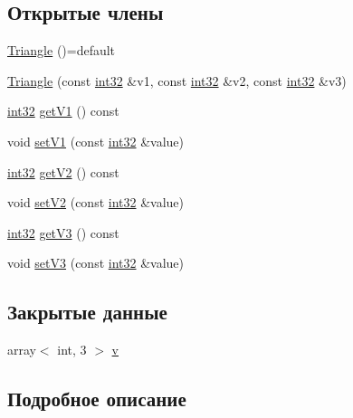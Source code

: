\subsection*{Открытые члены}
\begin{DoxyCompactItemize}
\item 
\hyperlink{class_triangle_abe6f0d035449cb80a7cc4d79baef9c3f}{Triangle} ()=default
\item 
\hyperlink{class_triangle_a287c84286a7340a754ee2df0a92af7af}{Triangle} (const \hyperlink{number_8h_a43d43196463bde49cb067f5c20ab8481}{int32} \&v1, const \hyperlink{number_8h_a43d43196463bde49cb067f5c20ab8481}{int32} \&v2, const \hyperlink{number_8h_a43d43196463bde49cb067f5c20ab8481}{int32} \&v3)
\item 
\hyperlink{number_8h_a43d43196463bde49cb067f5c20ab8481}{int32} \hyperlink{class_triangle_a0dd722e3cb9d7ea46e514f8abf76335e}{get\+V1} () const 
\item 
void \hyperlink{class_triangle_afece0efdaf53062c218d9bf70291e8ce}{set\+V1} (const \hyperlink{number_8h_a43d43196463bde49cb067f5c20ab8481}{int32} \&value)
\item 
\hyperlink{number_8h_a43d43196463bde49cb067f5c20ab8481}{int32} \hyperlink{class_triangle_a3c40179262b85e1eab30a10f9c65b898}{get\+V2} () const 
\item 
void \hyperlink{class_triangle_a35f9096c0a99c8b8dc6717755bc1ec07}{set\+V2} (const \hyperlink{number_8h_a43d43196463bde49cb067f5c20ab8481}{int32} \&value)
\item 
\hyperlink{number_8h_a43d43196463bde49cb067f5c20ab8481}{int32} \hyperlink{class_triangle_ae664a58d61cf1d7b966f578b21a7c1db}{get\+V3} () const 
\item 
void \hyperlink{class_triangle_aff0abb038d3c9088b5ab59616aeeaaf9}{set\+V3} (const \hyperlink{number_8h_a43d43196463bde49cb067f5c20ab8481}{int32} \&value)
\end{DoxyCompactItemize}
\subsection*{Закрытые данные}
\begin{DoxyCompactItemize}
\item 
array$<$ int, 3 $>$ \hyperlink{class_triangle_abfe7a6f1dcde5b737bf0aa67aa348b8d}{v}
\end{DoxyCompactItemize}


\subsection{Подробное описание}


